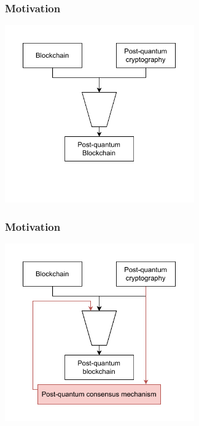 



\begin{frame}
  \frametitle{Motivation}
  \centering
  \includegraphics[width=22em]{img/mix.pdf}
\end{frame}

\begin{frame}
  \frametitle{Motivation}
  \centering
  \includegraphics[width=22em]{img/mix-full.pdf}
\end{frame}


